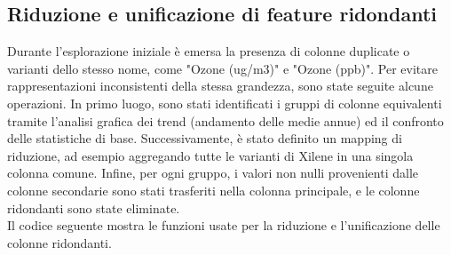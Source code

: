 \documentclass[a4paper,12pt]{report}
\begin{document}
	\subsection{Riduzione e unificazione di feature ridondanti}
	Durante l'esplorazione iniziale è emersa la presenza di colonne duplicate o varianti dello stesso nome, come "Ozone (ug/m3)" e "Ozone (ppb)". Per evitare rappresentazioni inconsistenti della stessa grandezza, sono state seguite alcune operazioni. In primo luogo, sono stati identificati i gruppi di colonne equivalenti tramite l'analisi grafica dei trend (andamento delle medie annue) ed il confronto delle statistiche di base. Successivamente, è stato definito un mapping di riduzione, ad esempio aggregando tutte le varianti di Xilene in una singola colonna comune. Infine, per ogni gruppo, i valori non nulli provenienti dalle colonne secondarie sono stati trasferiti nella colonna principale, e le colonne ridondanti sono state eliminate. \\
	Il codice seguente mostra le funzioni usate per la riduzione e l'unificazione delle colonne ridondanti.
\end{document}
